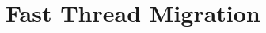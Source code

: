 \documentclass[12pt,a4paper]{book}
\begin{document}
\section{Fast Thread Migration}\label{ch:di:mig}
\blindtext
\end{document}
